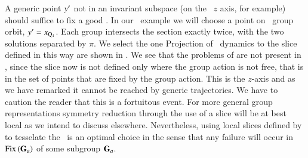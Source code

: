 A generic point ${y'} $ not in an invariant subspace (on
the \CLe\ $z$ axis, for example) should suffice to fix a good
\slice. In our \CLe\ example we will choose a point on \reqv\ group orbit,
 ${y'}  = x_{\mathrm{Q}_{1}}$. 
Each group intersects the section exactly twice,  with the
two solutions separated by $\pi$. We select the one  
 
Projection of \CLe\ dynamics to the slice defined in this way are
shown in . We see that the problems of 
 are not present in , since
the slice now is not defined only where the group action is not free,
that is in the set of points that are fixed by the group action. This
is the $z$-axis and as we have remarked it cannot be reached by generic
trajectories. We have to caution the reader that this is a fortuitous
event. For more general group representations symmetry reduction through
the use of a slice will be at best local as we intend to discuss 
elsewhere. Nevertheless, using local slices defined by 
to tesselate the \reducedsp\ is an optimal choice in the sense that any
failure will occur in \fixedsp\ $\mathrm{Fix}\left(\mathbf{G}_a\right)$ of some subgroup
$\mathbf{G}_a$.


